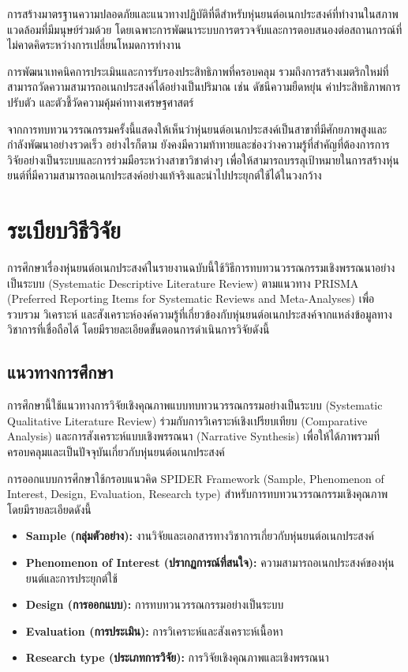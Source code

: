 \documentclass[a4paper]{article}
\begin{document}
การสร้างมาตรฐานความปลอดภัยและแนวทางปฏิบัติที่ดีสำหรับหุ่นยนต์อเนกประสงค์ที่ทำงานในสภาพแวดล้อมที่มีมนุษย์ร่วมด้วย โดยเฉพาะการพัฒนาระบบการตรวจจับและการตอบสนองต่อสถานการณ์ที่ไม่คาดคิดระหว่างการเปลี่ยนโหมดการทำงาน

การพัฒนาเทคนิคการประเมินและการรับรองประสิทธิภาพที่ครอบคลุม รวมถึงการสร้างเมตริกใหม่ที่สามารถวัดความสามารถอเนกประสงค์ได้อย่างเป็นปริมาณ เช่น ดัชนีความยืดหยุ่น ค่าประสิทธิภาพการปรับตัว และตัวชี้วัดความคุ้มค่าทางเศรษฐศาสตร์

จากการทบทวนวรรณกรรมครั้งนี้แสดงให้เห็นว่าหุ่นยนต์อเนกประสงค์เป็นสาขาที่มีศักยภาพสูงและกำลังพัฒนาอย่างรวดเร็ว อย่างไรก็ตาม ยังคงมีความท้าทายและช่องว่างความรู้ที่สำคัญที่ต้องการการวิจัยอย่างเป็นระบบและการร่วมมือระหว่างสาขาวิชาต่างๆ เพื่อให้สามารถบรรลุเป้าหมายในการสร้างหุ่นยนต์ที่มีความสามารถอเนกประสงค์อย่างแท้จริงและนำไปประยุกต์ใช้ได้ในวงกว้าง
\newpage
\section{ระเบียบวิธีวิจัย}
การศึกษาเรื่องหุ่นยนต์อเนกประสงค์ในรายงานฉบับนี้ใช้วิธีการทบทวนวรรณกรรมเชิงพรรณนาอย่างเป็นระบบ (Systematic Descriptive Literature Review) ตามแนวทาง PRISMA (Preferred Reporting Items for Systematic Reviews and Meta-Analyses) เพื่อรวบรวม วิเคราะห์ และสังเคราะห์องค์ความรู้ที่เกี่ยวข้องกับหุ่นยนต์อเนกประสงค์จากแหล่งข้อมูลทางวิชาการที่เชื่อถือได้ โดยมีรายละเอียดขั้นตอนการดำเนินการวิจัยดังนี้

\subsection{แนวทางการศึกษา}

การศึกษานี้ใช้แนวทางการวิจัยเชิงคุณภาพแบบทบทวนวรรณกรรมอย่างเป็นระบบ (Systematic Qualitative Literature Review) ร่วมกับการวิเคราะห์เชิงเปรียบเทียบ (Comparative Analysis) และการสังเคราะห์แบบเชิงพรรณนา (Narrative Synthesis) เพื่อให้ได้ภาพรวมที่ครอบคลุมและเป็นปัจจุบันเกี่ยวกับหุ่นยนต์อเนกประสงค์ 

การออกแบบการศึกษาใช้กรอบแนวคิด SPIDER Framework (Sample, Phenomenon of Interest, Design, Evaluation, Research type) สำหรับการทบทวนวรรณกรรมเชิงคุณภาพ โดยมีรายละเอียดดังนี้
\begin{itemize}
\item \textbf{Sample (กลุ่มตัวอย่าง):} งานวิจัยและเอกสารทางวิชาการเกี่ยวกับหุ่นยนต์อเนกประสงค์
\item \textbf{Phenomenon of Interest (ปรากฏการณ์ที่สนใจ):} ความสามารถอเนกประสงค์ของหุ่นยนต์และการประยุกต์ใช้
\item \textbf{Design (การออกแบบ):} การทบทวนวรรณกรรมอย่างเป็นระบบ
\item \textbf{Evaluation (การประเมิน):} การวิเคราะห์และสังเคราะห์เนื้อหา
\item \textbf{Research type (ประเภทการวิจัย):} การวิจัยเชิงคุณภาพและเชิงพรรณนา
\end{itemize}
\end{document}
